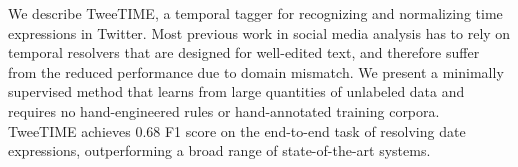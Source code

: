 We describe TweeTIME, a temporal tagger for recognizing and normalizing time expressions in Twitter. Most previous work in social media analysis has to rely on temporal resolvers that are designed for well-edited text, and therefore suffer from the reduced performance due to domain mismatch. We present a minimally supervised method that learns from large quantities of unlabeled data and requires no hand-engineered rules or hand-annotated training corpora. TweeTIME achieves 0.68 F1 score on the end-to-end task of resolving date expressions, outperforming a broad range of state-of-the-art systems.
